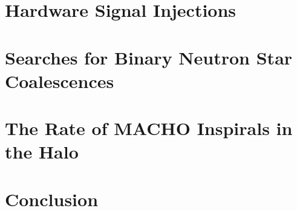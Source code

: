 \documentclass[12pt,notitlepage]{report}
\begin{document}
\chapter{Hardware Signal Injections}
\label{ch:hardware}

\chapter{Searches for Binary Neutron Star Coalescences}
\label{ch:bns}

\chapter{The Rate of MACHO Inspirals in the Halo}
\label{ch:result}

\chapter{Conclusion}
\label{ch:conclusion}


\clearpage



\clearpage
{}

\begin{startvita}
\end{startvita}

\renewenvironment{thebibliography}[1]%
  {\begin{list}{\labelenumi\hss}%
     {\usecounter{enumi}\setlength{\labelwidth}{3em}%
      \setlength{\leftmargin}{5em}}}%
  {\end{list}}
\renewcommand{\bibitem}[1]{\item\label{#1}\relax}%
\renewcommand{\theenumi}{\arabic{enumi}}%
\begin{publications}
\putbib[papers]
\end{publications}

\finishvita
\end{document}
